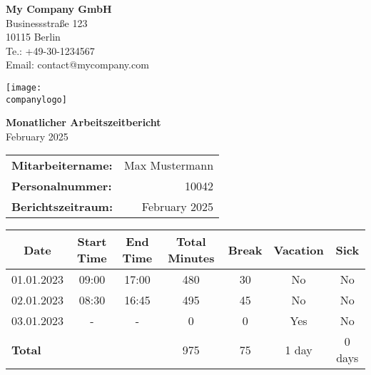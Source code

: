 \documentclass[11pt]{article}
\makeatletter
\newcommand{\companyname}{My Company GmbH} %
\newcommand{\companystreet}{Businessstraße 123} %
\newcommand{\companycity}{10115 Berlin} %
\newcommand{\companyphone}{+49-30-1234567} %
\newcommand{\companyemail}{contact@mycompany.com} %
\newcommand{\companylogo}{company_logo.png} %
\newcommand{\employeename}{Max Mustermann} %
\newcommand{\employeenumber}{10042} %
\newcommand{\reportperiod}{February 2025} %
\makeatother
\begin{document}
\begin{minipage}{0.6\textwidth}
    \textbf{\companyname} \\
    \companystreet \\
    \companycity \\
    Te.: \companyphone \\
    Email: \companyemail \\
\end{minipage}
\begin{minipage}{0.38\textwidth}
    \raggedleft
    \texttt{[image: \\companylogo]} %
\end{minipage}

\vspace{1cm}

\begin{center}
    {\LARGE \textbf{Monatlicher Arbeitszeitbericht}} \\
    \vspace{0.5cm}
    \reportperiod
\end{center}

\vspace{1cm}

\vspace{0.5cm}
\begin{tabularx}{\textwidth}{Xr} %
    \textbf{Mitarbeitername:} & \employeename \\
    \textbf{Personalnummer:} & \employeenumber \\
    \textbf{Berichtszeitraum:} & \reportperiod \\[0.5cm]
\end{tabularx}

\vspace{1cm}

\begin{center}
\begin{longtable}{|c|c|c|c|c|c|c|}
    \hline
    \textbf{Date} & \textbf{Start Time} & \textbf{End Time} & \textbf{Total Minutes} & \textbf{Break} & \textbf{Vacation} & \textbf{Sick} \\
    \hline
    01.01.2023 & 09:00 & 17:00 & 480 & 30 & No & No \\
    02.01.2023 & 08:30 & 16:45 & 495 & 45 & No & No \\
    03.01.2023 & - & - & 0 & 0 & Yes & No \\
    \hline
    \multicolumn{3}{|l|}{\textbf{Total}} & 975 & 75 & 1 day & 0 days \\
    \hline
\end{longtable}
\end{center}
\end{document}
